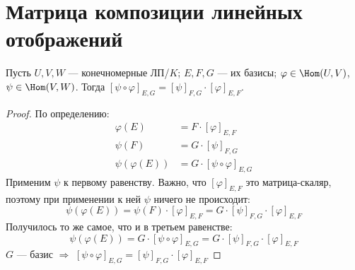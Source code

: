 \section{Матрица композиции линейных отображений}
\begin{theorem}
    Пусть $U, V, W$ --- конечномерные ЛП/$K$; $E, F, G$ --- их базисы;
    $\varphi \in \Hom(U, V)$, $\psi \in \Hom(V, W)$. Тогда
    $[\psi \circ \varphi]_{E,G} = [\psi]_{F,G} \cdot [\varphi]_{E,F}$.
\end{theorem}
\begin{proof}
    По определению:
    \begin{align*}
        \varphi(E) &= F \cdot [\varphi]_{E, F} \\
        \psi(F) &= G \cdot [\psi]_{F, G} \\
        \psi(\varphi(E)) &= G \cdot [\psi \circ \varphi]_{E, G} 
    \end{align*}
    Применим $\psi$ к первому равенству.
    Важно, что $[\varphi]_{E, F}$ это матрица-скаляр, поэтому при применении к ней $\psi$ ничего не происходит:
    \[ \psi(\varphi(E)) = \psi(F) \cdot [\varphi]_{E, F} = G \cdot [\psi]_{F, G} \cdot [\varphi]_{E, F}  \]
    Получилось то же самое, что и в третьем равенстве:
    \[ \psi(\varphi(E)) = G \cdot [\psi \circ \varphi]_{E, G} = G \cdot [\psi]_{F, G} \cdot [\varphi]_{E, F}  \]
    $G$ --- базис $\Longrightarrow$ 
    $[\psi \circ \varphi]_{E,G} = [\psi]_{F,G} \cdot [\varphi]_{E,F}$
\end{proof}
